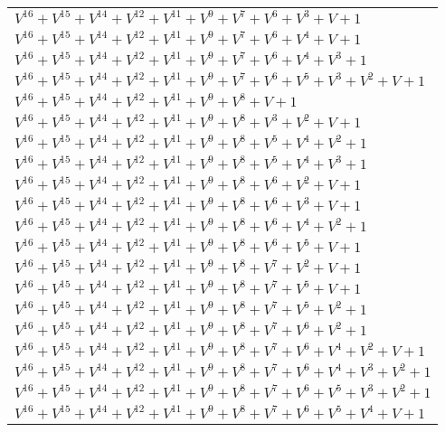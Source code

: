 \documentclass[12pt]{article}
\begin{document}
\begin{adjustwidth}{-4cm}{}
\begin{center}
\begin{longtable}{|l|}
$V^{16}  +V^{15}  +V^{14}  +V^{12}  +V^{11}  +V^{9}  +V^{7}  +V^{6}  +V^{3}  + V + 1$ \\
$V^{16}  +V^{15}  +V^{14}  +V^{12}  +V^{11}  +V^{9}  +V^{7}  +V^{6}  +V^{4}  + V + 1$ \\
$V^{16}  +V^{15}  +V^{14}  +V^{12}  +V^{11}  +V^{9}  +V^{7}  +V^{6}  +V^{4}  +V^{3}  + 1$ \\
$V^{16}  +V^{15}  +V^{14}  +V^{12}  +V^{11}  +V^{9}  +V^{7}  +V^{6}  +V^{5}  +V^{3}  +V^{2}  + V + 1$ \\
$V^{16}  +V^{15}  +V^{14}  +V^{12}  +V^{11}  +V^{9}  +V^{8}  + V + 1$ \\
$V^{16}  +V^{15}  +V^{14}  +V^{12}  +V^{11}  +V^{9}  +V^{8}  +V^{3}  +V^{2}  + V + 1$ \\
$V^{16}  +V^{15}  +V^{14}  +V^{12}  +V^{11}  +V^{9}  +V^{8}  +V^{5}  +V^{4}  +V^{2}  + 1$ \\
$V^{16}  +V^{15}  +V^{14}  +V^{12}  +V^{11}  +V^{9}  +V^{8}  +V^{5}  +V^{4}  +V^{3}  + 1$ \\
$V^{16}  +V^{15}  +V^{14}  +V^{12}  +V^{11}  +V^{9}  +V^{8}  +V^{6}  +V^{2}  + V + 1$ \\
$V^{16}  +V^{15}  +V^{14}  +V^{12}  +V^{11}  +V^{9}  +V^{8}  +V^{6}  +V^{3}  + V + 1$ \\
$V^{16}  +V^{15}  +V^{14}  +V^{12}  +V^{11}  +V^{9}  +V^{8}  +V^{6}  +V^{4}  +V^{2}  + 1$ \\
$V^{16}  +V^{15}  +V^{14}  +V^{12}  +V^{11}  +V^{9}  +V^{8}  +V^{6}  +V^{5}  + V + 1$ \\
$V^{16}  +V^{15}  +V^{14}  +V^{12}  +V^{11}  +V^{9}  +V^{8}  +V^{7}  +V^{2}  + V + 1$ \\
$V^{16}  +V^{15}  +V^{14}  +V^{12}  +V^{11}  +V^{9}  +V^{8}  +V^{7}  +V^{5}  + V + 1$ \\
$V^{16}  +V^{15}  +V^{14}  +V^{12}  +V^{11}  +V^{9}  +V^{8}  +V^{7}  +V^{5}  +V^{2}  + 1$ \\
$V^{16}  +V^{15}  +V^{14}  +V^{12}  +V^{11}  +V^{9}  +V^{8}  +V^{7}  +V^{6}  +V^{2}  + 1$ \\
$V^{16}  +V^{15}  +V^{14}  +V^{12}  +V^{11}  +V^{9}  +V^{8}  +V^{7}  +V^{6}  +V^{4}  +V^{2}  + V + 1$ \\
$V^{16}  +V^{15}  +V^{14}  +V^{12}  +V^{11}  +V^{9}  +V^{8}  +V^{7}  +V^{6}  +V^{4}  +V^{3}  +V^{2}  + 1$ \\
$V^{16}  +V^{15}  +V^{14}  +V^{12}  +V^{11}  +V^{9}  +V^{8}  +V^{7}  +V^{6}  +V^{5}  +V^{3}  +V^{2}  + 1$ \\
$V^{16}  +V^{15}  +V^{14}  +V^{12}  +V^{11}  +V^{9}  +V^{8}  +V^{7}  +V^{6}  +V^{5}  +V^{4}  + V + 1$ \\

\end{longtable}
\end{center}
\end{adjustwidth}
\end{document}
